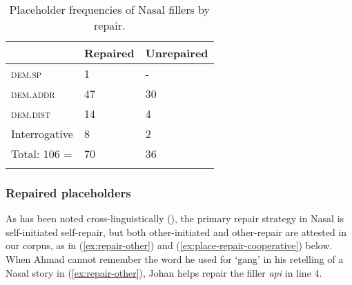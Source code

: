 \documentclass[output=paper,colorlinks,citecolor=brown
\ChapterDOI{10.5281/zenodo.15697585}
]{langscibook}
\begin{document}
\begin{table}
    \caption{Placeholder frequencies of Nasal fillers by repair.}
    \label{tab:billings:place-repair}
    \begin{tabularx}{.8\textwidth}{lYY}
        \lsptoprule
        & {Repaired} & {Unrepaired} \\
        \midrule
        \textsc{dem.sp} & 1 & - \\
        \textsc{dem.addr} & 47 & 30 \\
        \textsc{dem.dist} & 14 & 4 \\
        Interrogative & 8 & 2 \\\midrule
        Total: 106 = & 70 & 36 \\
        \lspbottomrule
    \end{tabularx}
\end{table}

\subsubsection{Repaired placeholders}
As has been noted cross-linguistically (\cite{nemeth2012repair}), the primary repair strategy in Nasal is self-initiated self-repair, but both other-initiated and other-repair are attested in our corpus, as in (\ref{ex:repair-other}) and (\ref{ex:place-repair-cooperative}) below. When Ahmad cannot remember the word he used for `gang' in his retelling of a Nasal story in (\ref{ex:repair-other}), Johan helps repair the filler \textit{api} in line 4.
\end{document}
